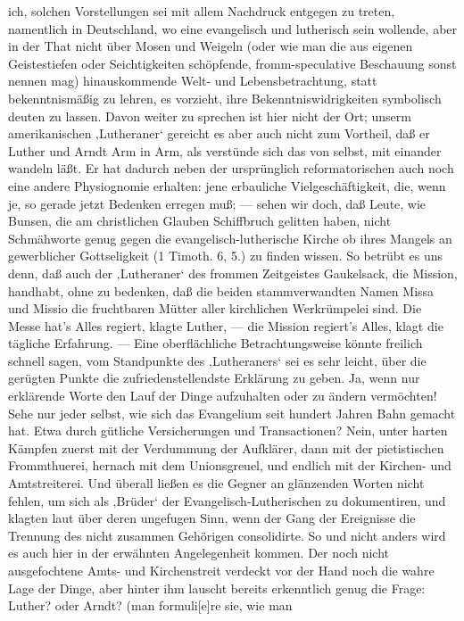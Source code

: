 ich, solchen Vorstellungen sei mit allem Nachdruck entgegen zu treten, namentlich in Deutschland, wo
eine evangelisch und lutherisch sein wollende, aber in der That nicht über Mosen und Weigeln (oder wie
man die aus eigenen Geistestiefen oder Seichtigkeiten schöpfende, fromm-speculative Beschauung sonst
nennen mag) hinauskommende Welt- und Lebensbetrachtung, statt bekenntnismäßig zu
lehren, es vorzieht, ihre Bekenntniswidrigkeiten symbolisch deuten zu lassen. Davon weiter zu sprechen
ist hier nicht der Ort; unserm amerikanischen ‚Lutheraner‘ gereicht es aber auch nicht zum Vortheil,
daß er Luther und Arndt Arm in Arm, als verstünde sich das von selbst, mit einander wandeln läßt. Er
hat dadurch neben der ursprünglich reformatorischen auch noch eine andere Physiognomie erhalten: jene
erbauliche Vielgeschäftigkeit, die, wenn je, so gerade jetzt Bedenken erregen muß; — sehen wir doch,
daß Leute, wie Bunsen, die am christlichen Glauben Schiffbruch gelitten haben, nicht Schmähworte genug
gegen die evangelisch-lutherische Kirche ob ihres Mangels an gewerblicher Gottseligkeit (1 Timoth. 6,
5.) zu finden wissen. So betrübt es uns denn, daß auch der ‚Lutheraner‘ des frommen Zeitgeistes
Gaukelsack, die Mission, handhabt, ohne zu bedenken, daß die beiden stammverwandten Namen Missa
und Missio die fruchtbaren Mütter aller kirchlichen Werkrümpelei sind. Die Messe hat’s Alles regiert,
klagte Luther, — die Mission regiert’s Alles, klagt die tägliche Erfahrung. — Eine oberflächliche
Betrachtungsweise könnte freilich schnell sagen, vom Standpunkte des ‚Lutheraners‘ sei es sehr leicht,
über die gerügten Punkte die zufriedenstellendste Erklärung zu geben. Ja, wenn nur erklärende Worte den
Lauf der Dinge aufzuhalten oder zu ändern vermöchten! Sehe nur jeder selbst, wie sich das Evangelium seit
hundert Jahren Bahn gemacht hat. Etwa durch gütliche Versicherungen und Transactionen? Nein, unter harten
Kämpfen zuerst mit der Verdummung der Aufklärer, dann mit der pietistischen Frommthuerei, hernach mit
dem Unionsgreuel, und endlich mit der Kirchen- und Amtstreiterei. Und überall ließen es die Gegner an
glänzenden Worten nicht fehlen, um sich als ‚Brüder‘ der Evangelisch-Lutherischen zu dokumentiren,
und klagten laut über deren ungefugen Sinn, wenn der Gang der Ereignisse die Trennung des nicht zusammen
Gehörigen consolidirte. So und nicht anders wird es auch hier in der erwähnten Angelegenheit kommen. Der
noch nicht ausgefochtene Amts- und Kirchenstreit verdeckt vor der Hand noch die wahre Lage der Dinge, aber
hinter ihm lauscht bereits erkenntlich genug die Frage: Luther? oder Arndt? (man formuli[e]re sie, wie man
